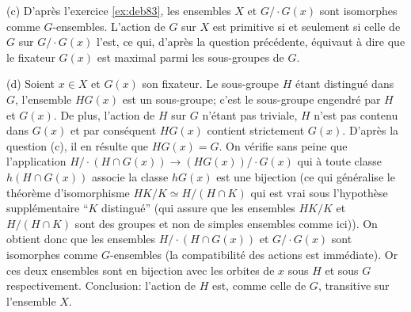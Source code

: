{{(c) D'apr\`es l'exercice \ref{ex:deb83}, les ensembles $X$ et $G/\cdot G(x)$ sont isomorphes comme
$G$-ensembles. L'action de $G$ sur $X$ est primitive si et seulement si celle de $G$ sur
$G/\cdot G(x)$ l'est, ce qui, d'apr\`es la question pr\'ec\'edente, \'equivaut \`a dire que le
fixateur $G(x)$ est maximal parmi les sous-groupes de $G$.
\medskip 

(d) Soient $x\in X$ et $G(x)$ son fixateur. Le sous-groupe $H$ \'etant distingu\'e dans
$G$, l'ensemble $HG(x)$ est un sous-groupe; c'est le sous-groupe engendr\'e par $H$ et
$G(x)$. De plus, l'action de $H$ sur $G$ n'\'etant pas triviale, $H$ n'est pas contenu dans
$G(x)$ et par cons\'equent $HG(x)$ contient strictement $G(x)$. D'apr\`es la question (c), il
en r\'esulte que $HG(x) = G$. On v\'erifie sans peine que l'application $H/\cdot (H\cap G(x))
\rightarrow (HG(x))/\cdot G(x)$ qui \`a toute classe $h(H\cap G(x))$ associe la classe $hG(x)$
est une bijection (ce qui g\'en\'eralise le th\'eor\`eme d'isomorphisme
$HK/K\simeq H/(H\cap K)$ qui est vrai sous l'hypoth\`ese suppl\'ementaire ``$K$
distingu\'e'' (qui assure que les ensembles $HK/K$ et $H/(H\cap K)$ sont des groupes et non
de simples ensembles comme ici)). On obtient donc que les ensembles $H/\cdot (H\cap
G(x))$ et $G/\cdot G(x)$ sont isomorphes comme $G$-ensembles (la compatibilit\'e des
actions est imm\'ediate). Or ces deux ensembles sont en bijection avec les orbites de $x$
sous $H$ et sous $G$ respectivement. Conclusion: l'action de $H$ est, comme celle de $G$,
transitive sur l'ensemble $X$.}
}